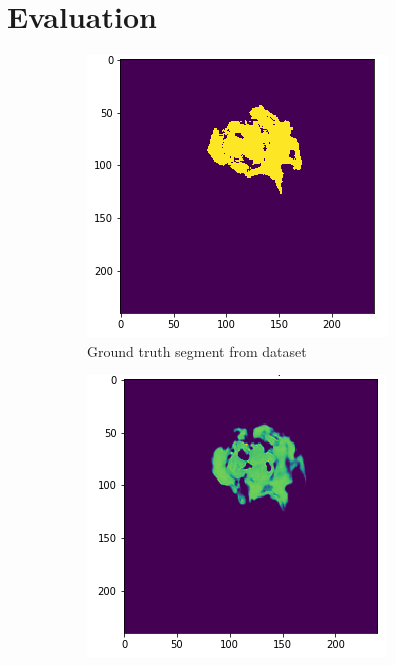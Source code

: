 \section{Evaluation}


\begin{figure}[H]
    \centering
    \begin{subfigure}[t]{.5\textwidth}
        \centering
        \includegraphics[width=\textwidth]{chapters/04_segmentation/images/network_output-0.png}
        \caption{Ground truth segment from dataset}
    \end{subfigure}%
    \begin{subfigure}[t]{.5\textwidth}
        \centering
        \includegraphics[width=\textwidth]{chapters/04_segmentation/images/network_output-1.png}

\end{subfigure}
\end{figure}
